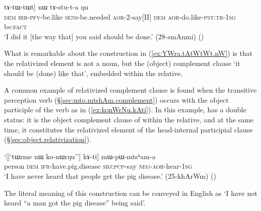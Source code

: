 \begin{exe}
\ex \label{ex:YWra.tAtWtWt.nW}
\gll [[``\textbf{nɯ} \textbf{a-tɤ-fse} \textbf{ɲɯ-ra}"] tɤ-tɯ-tɯt] nɯ tɤ-stu-t-a ŋu \\
\textsc{dem} \textsc{irr}-\textsc{pfv}-be.like \textsc{sens}-be.needed \textsc{aor}-2-say[II] \textsc{dem} \textsc{aor}-do.like-\textsc{pst}:\textsc{tr}-\textsc{1sg} be:\textsc{fact} \\
\glt `I did it [the way that] you said should be done.' (28-smAnmi)
()
\end{exe} 

What is remarkable about the construction in (\ref{ex:YWra.tAtWtWt.nW}) is that the relativized element is not a noun, but the (object) complement clause  `it should be (done) like that', embedded within the relative. 

A common example of relativized complement clause is found when the transitive perception verb  (§\ref{sec:mto.mtshAm.complement}) occurs with the object participle  of the verb  as in (\ref{ex:konWrNu.kAti}). In this example,  has a double status: it is the object complement clause of  within the relative, and at the same time, it constitutes the relativized element of the head-internal participial clause (§\ref{sec:object.relativization}). 

\begin{exe}
\ex \label{ex:konWrNu.kAti}
\gll `[[`tɯrme nɯ ko-nɯrŋu''] kɤ-ti] mɯ-pɯ-mtsʰam-a \\
person \textsc{dem} \textsc{ifr}-have.pig.disease \textsc{sbj}:\textsc{pcp}-say \textsc{neg}-\textsc{aor}-hear-\textsc{1sg} \\
\glt `I have never heard that people get the pig disease.' (25-khArWm)
()
\end{exe} 

The literal meaning of this construction can be conveyed in English as `I have not heard ``a man got the pig disease'' being said'.
